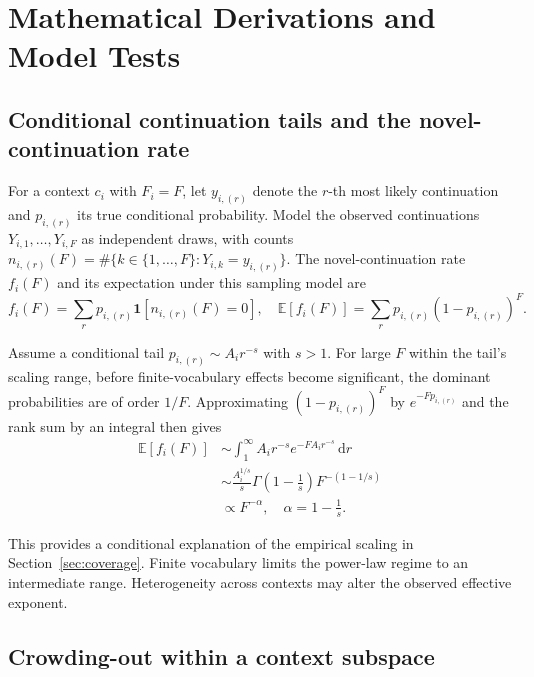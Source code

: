 \section{Mathematical Derivations and Model Tests}
\label{app:math}

\subsection{Conditional continuation tails and the novel-continuation rate}
For a context $c_i$ with $F_i=F$, let $y_{i,(r)}$ denote the $r$-th most likely continuation and $p_{i,(r)}$ its true conditional probability. Model the observed continuations $Y_{i,1},\ldots,Y_{i,F}$ as independent draws, with counts $n_{i,(r)}(F)=\#\{k\in\{1,\ldots,F\}:Y_{i,k}=y_{i,(r)}\}$. The novel-continuation rate $f_i(F)$ and its expectation under this sampling model are
\begin{equation}
f_i(F)=\sum_r p_{i,(r)}
\mathbf{1}\left[n_{i,(r)}(F)=0\right],
\quad
\mathbb{E}[f_i(F)]=\sum_r p_{i,(r)}(1-p_{i,(r)})^F.
\end{equation}

Assume a conditional tail $p_{i,(r)}\sim A_i r^{-s}$ with $s>1$. For large $F$ within the tail's scaling range, before finite-vocabulary effects become significant, the dominant probabilities are of order $1/F$. Approximating $(1-p_{i,(r)})^F$ by $e^{-Fp_{i,(r)}}$ and the rank sum by an integral then gives
\citep{gnedin2007occupancy}
\begin{equation}
\begin{aligned}
\mathbb{E}[f_i(F)]
&\sim
\int_1^\infty A_i r^{-s}e^{-F A_i r^{-s}}\,\mathrm{d}r\\
&\sim
\frac{A_i^{1/s}}{s}
\Gamma\left(1-\frac{1}{s}\right)
F^{-(1-1/s)}\\
&\propto F^{-\alpha},
\quad
\alpha=1-\frac{1}{s}.
\end{aligned}
\label{eq:occupancy}
\end{equation}

This provides a conditional explanation of the empirical scaling in Section~\ref{sec:coverage}. Finite vocabulary limits the power-law regime to an intermediate range. Heterogeneity across contexts may alter the observed effective exponent.

\subsection{Crowding-out within a context subspace}
\label{app:crowding-derivation}

